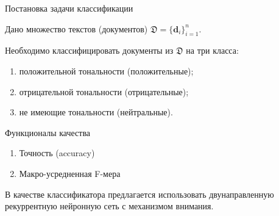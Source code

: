 \documentclass{beamer}
\begin{document}
\begin{frame}{Постановка задачи классификации}
	\begin{block}{}
        Дано множество текстов (документов) $\mathfrak{D} = \{\mathbf{d}_i\}_{i=1}^{n}$.
	\end{block}    
    
    \begin{block}{}
        Необходимо классифицировать документы из $\mathfrak{D}$ на три класса:
        	\begin{enumerate}
			\item положительной тональности (положительные);
			\item отрицательной тональности (отрицательные);
			\item не имеющие тональности (нейтральные).
			\end{enumerate}
	\end{block}
	
	\begin{block}{Функционалы качества}
		\begin{enumerate}
			\item Точность (accuracy)
			\item Макро-усредненная F-мера
		\end{enumerate}
	\end{block}
	В качестве классификатора предлагается использовать двунаправленную рекуррентную нейронную сеть с механизмом внимания.
\end{frame}
\end{document}
